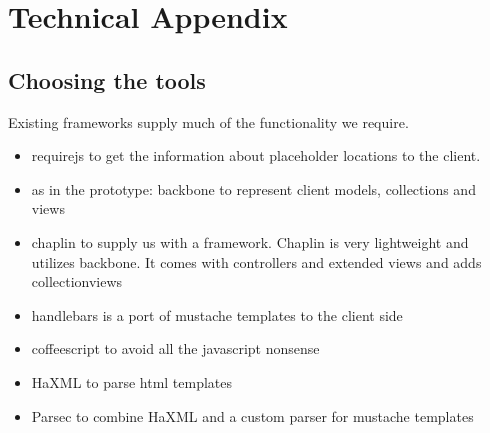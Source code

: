 \appendix
\chapter{Technical Appendix}
\section{Choosing the tools}
Existing frameworks supply much of the functionality we require.
\begin{itemize}
\item requirejs to get the information about placeholder locations to the client.
\item as in the prototype: backbone to represent client models,
	collections and views
\item chaplin to supply us with a framework. Chaplin is very lightweight and
	utilizes backbone. It comes with controllers and extended views and adds
	collectionviews
\item handlebars is a port of mustache templates to the client side
\item coffeescript to avoid all the javascript nonsense
\item HaXML to parse html templates
\item Parsec to combine HaXML and a custom parser for mustache templates
\end{itemize}
